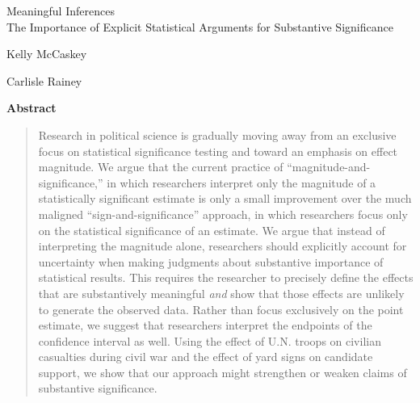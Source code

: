 \documentclass[12pt]{article}
\begin{document}
\begin{center}
{\LARGE Meaningful Inferences}\\\vspace{2mm}
{\large The Importance of Explicit Statistical Arguments for Substantive Significance}\\\vspace{2mm}


\vspace{10mm}

Kelly McCaskey

\vspace{3mm}

Carlisle Rainey
\end{center}

\vspace{10mm}

{\centerline{\textbf{Abstract}}}
\begin{quote}\noindent
Research in political science is gradually moving away from an exclusive focus on statistical significance testing and toward an emphasis on effect magnitude. We argue that the current practice of ``magnitude-and-significance,'' in which researchers interpret only the magnitude of a statistically significant estimate is only a small improvement over the much maligned ``sign-and-significance'' approach, in which researchers focus only on the statistical significance of an estimate. We argue that instead of interpreting the magnitude alone, researchers should explicitly account for uncertainty when making judgments about substantive importance of statistical results. This requires the researcher to precisely define the effects that are substantively meaningful \emph{and} show that those effects are unlikely to generate the observed data. Rather than focus exclusively on the point estimate, we suggest that researchers interpret the endpoints of the confidence interval as well. Using the effect of U.N. troops on civilian casualties during civil war and the effect of yard signs on candidate support, we show that our approach might strengthen or weaken claims of substantive significance. 
 \end{quote}
\end{document}
